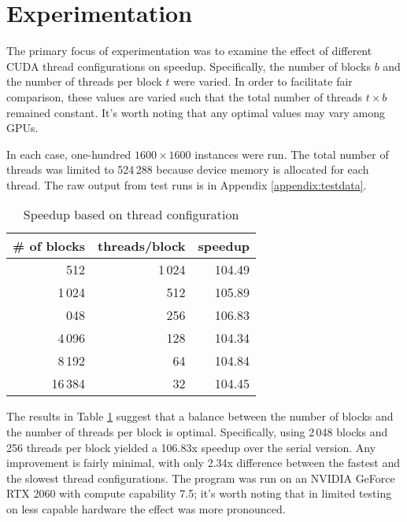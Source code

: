 \documentclass{article}
\begin{document}
\section{Experimentation}
    The primary focus of experimentation was to examine the effect of different CUDA thread configurations on speedup. Specifically, the number of blocks $b$ and the number of threads per block $t$ were varied. In order to facilitate fair comparison, these values are varied such that the total number of threads $t \times b$ remained constant. It's worth noting that any optimal values may vary among GPUs.

    In each case, one-hundred $1600 \times 1600$ instances were run. The total number of threads was limited to 524\,288 because device memory is allocated for each thread. The raw output from test runs is in Appendix \ref{appendix:testdata}.

    \def\boxit#1{%
      \smash{\fboxsep=0pt\llap{\rlap{\fbox{\strut\makebox[#1]{}}}~}}\ignorespaces
    }

    \renewcommand{\arraystretch}{1.5}
    \begin{table}[h]
    \centering
    \caption{Speedup based on thread configuration}
    \begin{tabular}{r | r || r}\label{tab:speedup}
    \# of blocks & threads/block & speedup \\ \hline
    512                 & 1\,024    & 104.49 \\
    1\,024              & 512       & 105.89 \\
    \boxit{150pt}2\,048 & 256       & 106.83 \\
    4\,096              & 128       & 104.34 \\
    8\,192              & 64        & 104.84 \\
    16\,384             & 32        & 104.45
    \end{tabular}
    \end{table}

    The results in Table \ref{tab:speedup} suggest that a balance between the number of blocks and the number of threads per block is optimal. Specifically, using 2\,048 blocks and 256 threads per block yielded a 106.83x speedup over the serial version. Any improvement is fairly minimal, with only 2.34x difference between the fastest and the slowest thread configurations. The program was run on an NVIDIA GeForce RTX 2060 with compute capability 7.5; it's worth noting that in limited testing on less capable hardware the effect was more pronounced.
\end{document}
